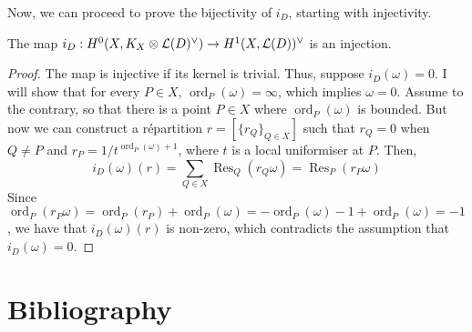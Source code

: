 \documentclass[12pt]{article}
\DeclareMathOperator{\ord}{ord}
\DeclareMathOperator{\res}{Res}
\begin{document}
Now, we can proceed to prove the bijectivity of $i_{D}$, starting with
injectivity.
\begin{lemm}
  The map $i_{D}:H^0(X,K_X\otimes\mathcal{L}(D)^{\vee})\to H^{1}(X,\mathcal{L}(D))^{\vee}$ is an injection.
\end{lemm}
\begin{proof}
  The map is injective if its kernel is trivial. Thus, suppose
  $i_{D}(\omega)=0$. I will show that for every $P\in X$,
  $\ord_{P}(\omega)=\infty$, which implies $\omega=0$.
  Assume to the contrary, so that there is a point $P\in X$ where
  $\ord_{P}(\omega)$ is bounded. But now we can construct a r\'epartition
  $r=[\{r_{Q}\}_{Q\in X}]$ such that $r_{Q}=0$ when $Q\neq P$ and
  $r_{P}=1/t^{\ord_{P}(\omega)+1}$, where $t$ is a local uniformiser at $P$.
  Then,
  \[
    i_{D}(\omega)(r)=\sum_{Q\in X}\res_{Q}(r_{Q}\omega)=\res_{P}(r_{P}\omega)
  \]
  Since $\ord_{P}(r_{P}\omega)=\ord_{P}(r_{P})+\ord_{P}(\omega)
  =-\ord_{P}(\omega)-1+\ord_{P}(\omega)=-1$, we have that $i_{D}(\omega)(r)$ is
  non-zero, which contradicts the assumption that $i_{D}(\omega)=0$.
\end{proof}

\section{Bibliography}


\end{document}
